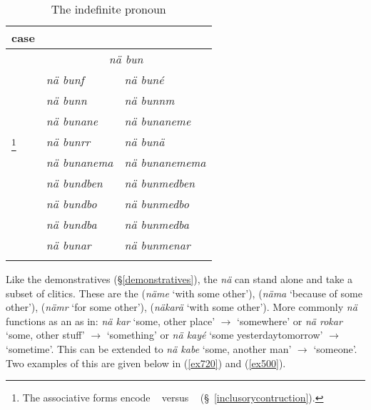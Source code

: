 \begin{table}
\caption{The indefinite pronoun}
\label{indefpron-table}
	\begin{tabularx}{\textwidth}{XXl}
		\lsptoprule
		case&\Sg{}&\Nsg{}\\ 
		\hline
		\Abs{}&\multicolumn{2}{|c|}{\emph{nä bun}}\\\cline{2-3}
		\Erg{}&\emph{nä bunf}&\emph{nä buné}\\
		\Dat{}&\emph{nä bunn}&\emph{nä bunnm}\\
		\Poss{}&\emph{nä bunane}&\emph{nä bunaneme}\\
		\Assoc{}\footnote{The associative forms encode \Du~ versus \Pl~ (\S~\ref{inclusorycontruction}).}&\emph{nä bunrr}&\emph{nä bunä}\\
		\Char{}&\emph{nä bunanema}&\emph{nä bunanemema}\\
		\Loc{}&\emph{nä bundben}& \emph{nä bunmedben}\\
		\All{}&\emph{nä bundbo}&\emph{nä bunmedbo}\\
		\Abl{}&\emph{nä bundba}&\emph{nä bunmedba}\\
		\Purp{}&\emph{nä bunar}&\emph{nä bunmenar}\\
		\lspbottomrule 
	\end{tabularx}
\end{table}%

Like the demonstratives (\S{}\ref{demonstratives}), the  \emph{nä} can stand alone and take a subset of  clitics. These are the  (\emph{näme} `with some other'),  (\emph{näma} `because of some other'),  (\emph{nämr} `for some other'),  (\emph{näkarä} `with some other'). More commonly \emph{nä} functions as an   as in: \emph{nä kar} `some, other place' $\rightarrow$ `somewhere' or \emph{nä rokar} `some, other stuff' $\rightarrow$ `something' or \emph{nä kayé} `some yesterday\textbar{}tomorrow' $\rightarrow$ `sometime'. This can be extended to \emph{nä kabe} `some, another man' $\rightarrow$ `someone'. Two examples of this are given below in (\ref{ex720}) and (\ref{ex500}).

